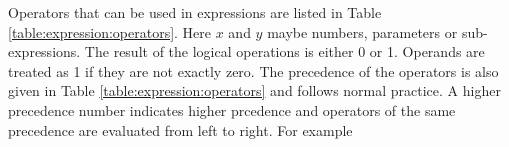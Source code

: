 Operators that can be used in expressions are listed in Table
\ref{table:expression:operators}. Here $x$ and $y$ maybe numbers,
parameters or sub-expressions.
The result of the logical operations is either 0 or 1.
Operands are treated as 1 if they are not exactly zero.
The precedence of the operators is also given in Table
\ref{table:expression:operators} and follows normal practice.
A higher precedence number indicates higher prcedence and
operators of the same precedence are evaluated from left to right.
For example\\
\hspace*{\fill}
\clearpage
